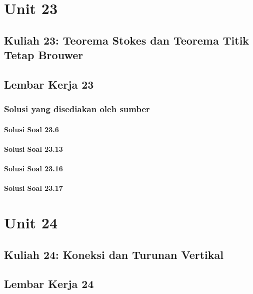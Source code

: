 \documentclass[11pt,a4paper,oneside]{book}
\begin{document}
\part{Unit 23}
\chapter[Kuliah 23]{Kuliah 23: Teorema Stokes dan Teorema Titik Tetap Brouwer}


\chapter{Lembar Kerja 23}


\section*{Solusi yang disediakan oleh sumber}
\subsection*{Solusi Soal 23.6}

\subsection*{Solusi Soal 23.13}

\subsection*{Solusi Soal 23.16}

\subsection*{Solusi Soal 23.17}


\part{Unit 24}
\chapter[Kuliah 24]{Kuliah 24: Koneksi dan Turunan Vertikal}


\chapter{Lembar Kerja 24}

\end{document}
